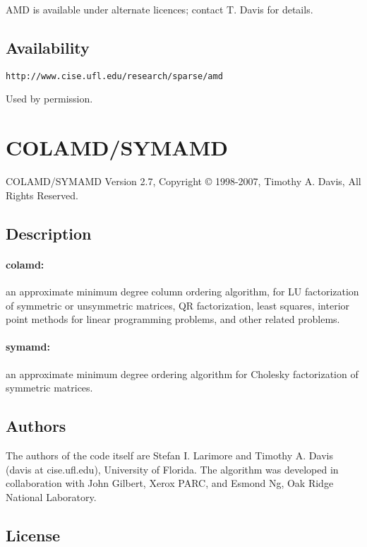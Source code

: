 \begin{footnotesize}
AMD is available under alternate licences; contact T. Davis for
details.

\subsection*{Availability}

\verb|http://www.cise.ufl.edu/research/sparse/amd|

\bigskip

\noindent
Used by permission.

\section{COLAMD/SYMAMD}

COLAMD/SYMAMD Version 2.7, Copyright {\copyright} 1998-2007, Timothy A.
Davis, All Rights Reserved.

\subsection*{Description}

\paragraph{colamd:} an approximate minimum degree column ordering
algorithm, for LU factorization of symmetric or unsymmetric matrices,
QR factorization, least squares, interior point methods for linear
programming problems, and other related problems.

\paragraph{symamd:} an approximate minimum degree ordering algorithm
for Cholesky factorization of symmetric matrices.

\subsection*{Authors}

The authors of the code itself are Stefan I. Larimore and Timothy A.
Davis (davis at cise.ufl.edu), University of Florida.  The algorithm
was developed in collaboration with John Gilbert, Xerox PARC, and
Esmond Ng, Oak Ridge National Laboratory.

\subsection*{License}


\end{footnotesize}
